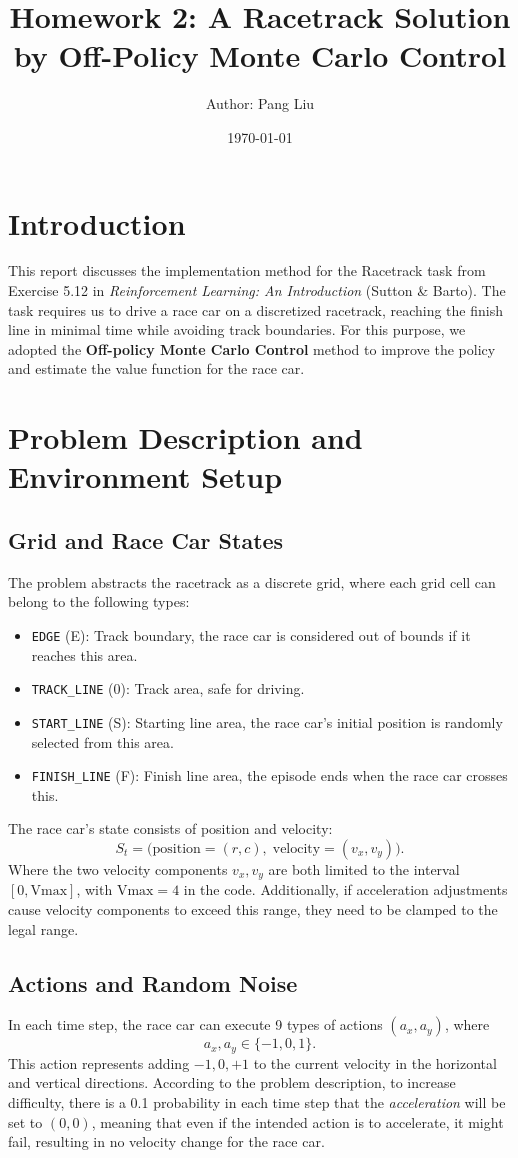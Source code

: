 \documentclass{article}
\title{Homework 2: A Racetrack Solution by Off-Policy Monte Carlo Control}
\author{Author: Pang Liu}
\date{\today}
\begin{document}
\maketitle

\section{Introduction}
This report discusses the implementation method for the Racetrack task from Exercise 5.12 in \emph{Reinforcement Learning: An Introduction} (Sutton \& Barto). The task requires us to drive a race car on a discretized racetrack, reaching the finish line in minimal time while avoiding track boundaries. For this purpose, we adopted the \textbf{Off-policy Monte Carlo Control} method to improve the policy and estimate the value function for the race car.

\section{Problem Description and Environment Setup}
\subsection{Grid and Race Car States}
The problem abstracts the racetrack as a discrete grid, where each grid cell can belong to the following types:
\begin{itemize}
    \item \texttt{EDGE} (E): Track boundary, the race car is considered out of bounds if it reaches this area.
    \item \texttt{TRACK\_LINE} (0): Track area, safe for driving.
    \item \texttt{START\_LINE} (S): Starting line area, the race car's initial position is randomly selected from this area.
    \item \texttt{FINISH\_LINE} (F): Finish line area, the episode ends when the race car crosses this.
\end{itemize}

The race car's state consists of position and velocity:
\[
S_t = \bigl(\text{position}=(r,c),\; \text{velocity}=(v_x, v_y)\bigr).
\]
Where the two velocity components \(v_x, v_y\) are both limited to the interval \([0,\text{Vmax}]\), with \(\text{Vmax} = 4\) in the code. Additionally, if acceleration adjustments cause velocity components to exceed this range, they need to be clamped to the legal range.

\subsection{Actions and Random Noise}
In each time step, the race car can execute 9 types of actions \((a_x, a_y)\), where
\[
a_x, a_y \in \{-1, 0, 1\}.
\]
This action represents adding \(-1, 0, +1\) to the current velocity in the horizontal and vertical directions. According to the problem description, to increase difficulty, there is a 0.1 probability in each time step that the \emph{acceleration} will be set to \((0,0)\), meaning that even if the intended action is to accelerate, it might fail, resulting in no velocity change for the race car.
\end{document}
